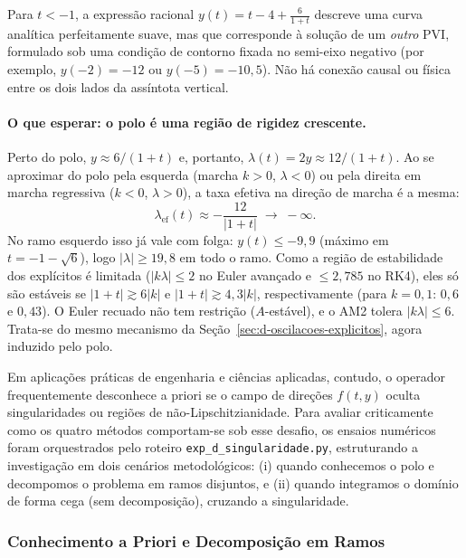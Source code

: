 \documentclass[12pt, a4paper]{article}
\begin{document}
Para $t < -1$, a expressão racional $y(t) = t - 4 + \frac{6}{1+t}$ descreve uma curva analítica perfeitamente suave, mas que corresponde à solução de um \emph{outro} PVI, formulado sob uma condição de contorno fixada no semi-eixo negativo (por exemplo, $y(-2) = -12$ ou $y(-5) = -10{,}5$). Não há conexão causal ou física entre os dois lados da assíntota vertical.


\paragraph{O que esperar: o polo é uma região de rigidez crescente.}
Perto do polo, $y\approx 6/(1+t)$ e, portanto, $\lambda(t)=2y\approx 12/(1+t)$. Ao se aproximar do polo pela esquerda (marcha $k>0$, $\lambda<0$) ou pela direita em marcha regressiva ($k<0$, $\lambda>0$), a taxa efetiva na direção de marcha é a mesma:
\begin{equation}\label{eq:d-lambda-polo}
  \lambda_{\mathrm{ef}}(t)\approx -\frac{12}{|1+t|}\;\longrightarrow\;-\infty .
\end{equation}
No ramo esquerdo isso já vale com folga: $y(t)\le -9{,}9$ (máximo em $t=-1-\sqrt6$), logo $|\lambda|\ge 19{,}8$ em todo o ramo. Como a região de estabilidade dos explícitos é limitada ($|k\lambda|\le 2$ no Euler avançado e $\le 2{,}785$ no RK4), eles só são estáveis se $|1+t|\gtrsim 6|k|$ e $|1+t|\gtrsim 4{,}3|k|$, respectivamente (para $k=0{,}1$: $0{,}6$ e $0{,}43$). O Euler recuado não tem restrição ($A$-estável), e o AM2 tolera $|k\lambda|\le 6$. Trata-se do mesmo mecanismo da Seção~\ref{sec:d-oscilacoes-explicitos}, agora induzido pelo polo.

Em aplicações práticas de engenharia e ciências aplicadas, contudo, o operador frequentemente desconhece a priori se o campo de direções $f(t, y)$ oculta singularidades ou regiões de não-Lipschitzianidade. Para avaliar criticamente como os quatro métodos comportam-se sob esse desafio, os ensaios numéricos foram orquestrados pelo roteiro \texttt{exp\_d\_singularidade.py}, estruturando a investigação em dois cenários metodológicos: (i) quando conhecemos o polo e decompomos o problema em ramos disjuntos, e (ii) quando integramos o domínio de forma cega (sem decomposição), cruzando a singularidade.

\subsubsection{Conhecimento a Priori e Decomposição em Ramos}
\label{sec:d-decomposicao}
\end{document}

